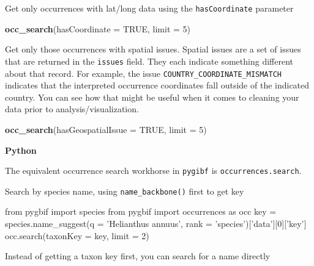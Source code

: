 \documentclass[author-year, review, 11pt]{components/elsarticle} %
\newenvironment{Shaded}{\begin{snugshade}}{\end{snugshade}}
\newcommand{\KeywordTok}[1]{\textcolor[rgb]{0.13,0.29,0.53}{\textbf{{#1}}}}
\newcommand{\DataTypeTok}[1]{\textcolor[rgb]{0.13,0.29,0.53}{{#1}}}
\newcommand{\DecValTok}[1]{\textcolor[rgb]{0.00,0.00,0.81}{{#1}}}
\newcommand{\CharTok}[1]{\textcolor[rgb]{0.31,0.60,0.02}{{#1}}}
\newcommand{\StringTok}[1]{\textcolor[rgb]{0.31,0.60,0.02}{{#1}}}
\newcommand{\OtherTok}[1]{\textcolor[rgb]{0.56,0.35,0.01}{{#1}}}
\newcommand{\NormalTok}[1]{{#1}}
\begin{document}
Get only occurrences with lat/long data using the \texttt{hasCoordinate}
parameter

\begin{Shaded}
\begin{Highlighting}[]
\KeywordTok{occ_search}\NormalTok{(}\DataTypeTok{hasCoordinate =} \OtherTok{TRUE}\NormalTok{, }\DataTypeTok{limit =} \DecValTok{5}\NormalTok{)}
\end{Highlighting}
\end{Shaded}

Get only those occurrences with spatial issues. Spatial issues are a set
of issues that are returned in the \texttt{issues} field. They each
indicate something different about that record. For example, the issue
\texttt{COUNTRY\_COORDINATE\_MISMATCH} indicates that the interpreted
occurrence coordinates fall outside of the indicated country. You can
see how that might be useful when it comes to cleaning your data prior
to analysis/visualization.

\begin{Shaded}
\begin{Highlighting}[]
\KeywordTok{occ_search}\NormalTok{(}\DataTypeTok{hasGeospatialIssue =} \OtherTok{TRUE}\NormalTok{, }\DataTypeTok{limit =} \DecValTok{5}\NormalTok{)}
\end{Highlighting}
\end{Shaded}

\textbf{Python}

The equivalent occurrence search workhorse in \texttt{pygibf} is
\texttt{occurrences.search}.

Search by species name, using \texttt{name\_backbone()} first to get key

\begin{Shaded}
\begin{Highlighting}[]
\CharTok{from} \NormalTok{pygbif }\CharTok{import} \NormalTok{species}
\CharTok{from} \NormalTok{pygbif }\CharTok{import} \NormalTok{occurrences }\CharTok{as} \NormalTok{occ}
\NormalTok{key = species.name_suggest(q = }\StringTok{'Helianthus annuus'}\NormalTok{, rank = }\StringTok{'species'}\NormalTok{)[}\StringTok{'data'}\NormalTok{][}\DecValTok{0}\NormalTok{][}\StringTok{'key'}\NormalTok{]}
\NormalTok{occ.search(taxonKey = key, limit = }\DecValTok{2}\NormalTok{)}
\end{Highlighting}
\end{Shaded}

Instead of getting a taxon key first, you can search for a name directly
\end{document}

